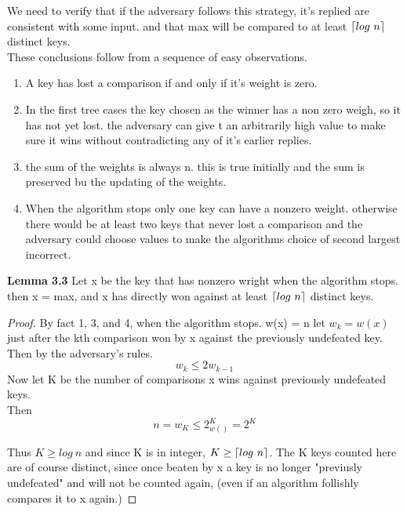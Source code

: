 \documentclass[a4paper,10pt,titlepage]{report}
\DeclarePairedDelimiter{\ceil}{\lceil}{\rceil}
\begin{document}
\vspace{5mm}
We need to verify that if the adversary follows this strategy, it's replied are consistent with some input. and that max will be compared to at least $\ceil{log \ n} $ distinct keys.
\\
These conclusions follow from a sequence of easy observations.\\

\begin{enumerate}
\item A key has lost a comparison if and only if it's weight is zero.
\item In the first tree cases the key chosen as the winner has a non zero weigh, so it has not yet lost. the adversary can give t an arbitrarily high value to make sure it wins without contradicting any of it's earlier replies.
\item the sum of the weights is always n. this is true initially and the sum is preserved bu the updating of the weights.
\item When the algorithm stops only one key can have a nonzero weight. otherwise there would be at least two keys that never lost a comparison and the adversary could choose values to make the algorithms choice of second largest incorrect.
\end{enumerate}
\vspace{5mm}
\textbf{Lemma 3.3} Let x be the key that has nonzero wright when the algorithm stops. then x = max, and x has directly won against at least $\ceil{log \ n}$ distinct keys.

\begin{proof}
By fact 1, 3, and 4, when the algorithm stops. w(x) = n let $w_k = w(x)$ just after the kth comparison won by x against the previously undefeated key. Then by the adversary's rules.
\begin{equation}
w_k \leq 2w_{k-1}
\end{equation}
Now let K be the number of comparisons x wins against previously undefeated keys.\\
Then 
\begin{equation}
n = w_K \leq 2^K_{w()} = 2^K
\end{equation}

Thus $K \geq log \ n$ and since K is in integer, $K \geq \ceil {log \ n}$. The K keys counted here are of course distinct, since once beaten by x a key is no longer "previusly undefeated" and will not be counted again, (even if an algorithm follishly compares it to x again.)
\end{proof}
\end{document}
